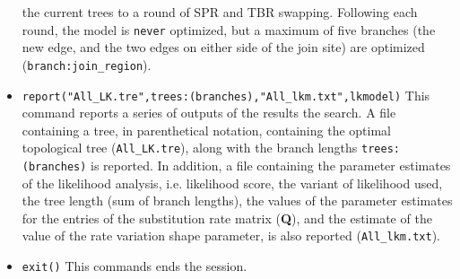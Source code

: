 \begin{itemize}
the current trees to a round of SPR and TBR swapping. Following each round, 
the model is \texttt{never} optimized, but a maximum of five branches 
(the new edge, and the two edges on either side of the join site) are 
optimized (\texttt{branch:join\_region}).
\item \texttt{report("All\_LK.tre",trees:(branches),"All\_lkm.txt",lkmodel)} 
This command reports a series of outputs of the results the search. A file 
containing a tree, in parenthetical notation, containing the optimal 
topological tree (\texttt{All\_LK.tre}), along with the branch lengths 
\texttt{trees:(branches)} is reported. In addition, a file containing the parameter 
estimates of the likelihood analysis, i.e. likelihood score, the variant of 
likelihood used, the tree length (sum of branch lengths), the values of 
the parameter estimates for the entries of the substitution rate matrix 
(\textbf{Q}), and the estimate of the value of the rate variation shape 
parameter, is also reported (\texttt{All\_lkm.txt}).
\item \texttt{exit()} This commands ends the \poy session.
\end{itemize}